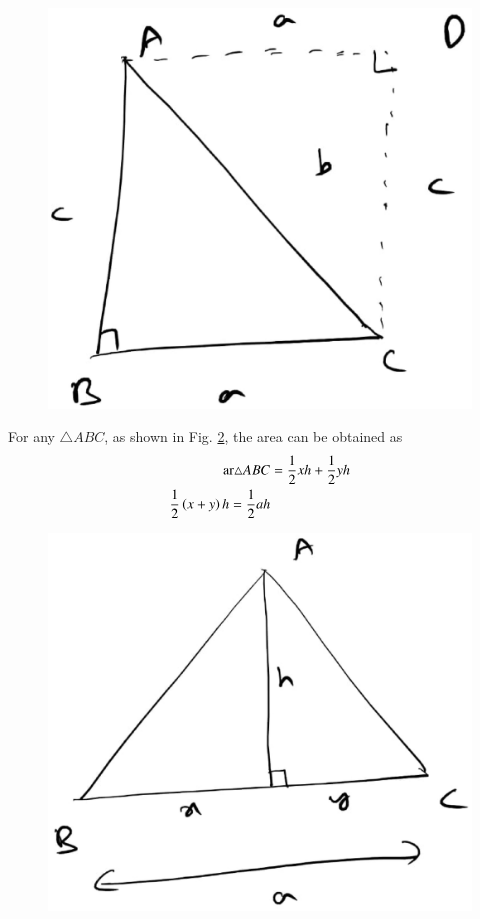 \begin{enumerate}[label=\arabic*.,ref=\thesubsection.\theenumi]
\begin{figure}[!ht]
\includegraphics[width=\columnwidth]{./triangle/figs/tri_right_area.eps}
\caption{}
\label{fig:tri_right_area}
\end{figure}
%
For any $\triangle ABC$, as shown in Fig.  \ref{fig:tri_area}, the area can be obtained as
%
\begin{align}
\text{ar}\triangle ABC&=\frac{1}{2}xh+\frac{1}{2}yh 
\\
\frac{1}{2}\left(x+y\right)h = \frac{1}{2}ah
\end{align} 
%

%
\begin{figure}[!ht]
\includegraphics[width=\columnwidth]{./triangle/figs/tri_area.eps}
\caption{}
\label{fig:tri_area}
\end{figure}
%


\end{enumerate}
